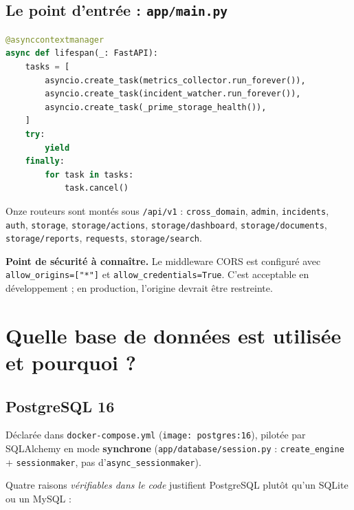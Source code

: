 \documentclass[11pt,a4paper]{report}
\newcommand{\file}[1]{\texttt{\small #1}}
\newcommand{\fn}[1]{\texttt{\small\textcolor{oasisviolet}{#1}}}
\newcommand{\route}[1]{\texttt{\small\textcolor{oasisgreen}{#1}}}
\begin{document}
\subsection{Le point d'entrée : \file{app/main.py}}

\begin{lstlisting}[language=Python,caption={Cycle de vie de l'application (extrait réel)}]
@asynccontextmanager
async def lifespan(_: FastAPI):
    tasks = [
        asyncio.create_task(metrics_collector.run_forever()),
        asyncio.create_task(incident_watcher.run_forever()),
        asyncio.create_task(_prime_storage_health()),
    ]
    try:
        yield
    finally:
        for task in tasks:
            task.cancel()
\end{lstlisting}

\noindent
Onze routeurs sont montés sous \route{/api/v1} : \texttt{cross\_domain},
\texttt{admin}, \texttt{incidents}, \texttt{auth}, \texttt{storage},
\texttt{storage/actions}, \texttt{storage/dashboard}, \texttt{storage/documents},
\texttt{storage/reports}, \texttt{requests}, \texttt{storage/search}.

\begin{warnbox}
\textbf{Point de sécurité à connaître.} Le middleware CORS est configuré avec
\texttt{allow\_origins=["*"]} et \texttt{allow\_credentials=True}. C'est
acceptable en développement ; en production, l'origine devrait être restreinte.
\end{warnbox}

\section{Quelle base de données est utilisée et pourquoi ?}

\subsection{PostgreSQL 16}

Déclarée dans \file{docker-compose.yml} (\texttt{image: postgres:16}), pilotée
par SQLAlchemy en mode \textbf{synchrone} (\file{app/database/session.py} :
\fn{create\_engine} + \fn{sessionmaker}, pas d'\texttt{async\_sessionmaker}).

Quatre raisons \emph{vérifiables dans le code} justifient PostgreSQL plutôt
qu'un SQLite ou un MySQL :
\end{document}
